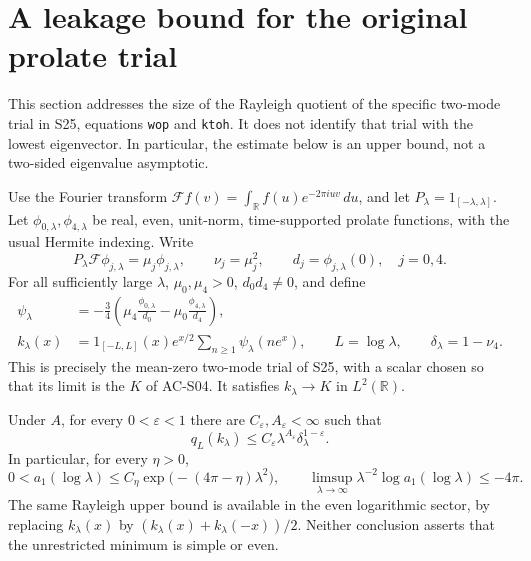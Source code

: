 \section{A leakage bound for the original prolate trial}
\label{sec:spectral-prolate-rayleigh}

This section addresses the size of the Rayleigh quotient of the
specific two-mode trial in S25, equations \texttt{wop} and
\texttt{ktoh}.  It does not identify that trial with the lowest
eigenvector.  In particular, the estimate below is an upper bound,
not a two-sided eigenvalue asymptotic.

\begin{theorem}
\label{AC-S30}
Use the Fourier transform
$\mathcal Ff(v)=\int_{\mathbb R}f(u)e^{-2\pi iuv}\,du$,
and let $P_\lambda=1_{[-\lambda,\lambda]}$.
Let $\phi_{0,\lambda},\phi_{4,\lambda}$ be real, even,
unit-norm, time-supported prolate functions, with the usual
Hermite indexing.  Write
\[
 P_\lambda\mathcal F\phi_{j,\lambda}
       =\mu_j\phi_{j,\lambda},\qquad
 \nu_j=\mu_j^2,\qquad d_j=\phi_{j,\lambda}(0),
             \quad j=0,4.                         \tag{SR.1}
\]
For all sufficiently large $\lambda$, $\mu_0,\mu_4>0$,
$d_0d_4\ne0$, and define
\[
 \begin{split}
 \psi_\lambda&=-\frac34\left(
          \mu_4\frac{\phi_{0,\lambda}}{d_0}
             -\mu_0\frac{\phi_{4,\lambda}}{d_4}\right),\\
 k_\lambda(x)&=1_{[-L,L]}(x)e^{x/2}
                 \sum_{n\geq1}\psi_\lambda(ne^x),
                  \qquad L=\log\lambda,\qquad
 \delta_\lambda=1-\nu_4.                           \end{split}
 \tag{SR.2}
\]
This is precisely the mean-zero two-mode trial of S25,
with a scalar chosen so that its limit is the $K$ of AC-S04.
It satisfies $k_\lambda\to K$ in $L^2(\mathbb R)$.

Under $A$, for every $0<\varepsilon<1$ there are
$C_\varepsilon,A_\varepsilon<\infty$ such that
\[
 q_L(k_\lambda)\leq
       C_\varepsilon\lambda^{A_\varepsilon}
                       \delta_\lambda^{1-\varepsilon}.
                                                        \tag{SR.3}
\]
In particular, for every $\eta>0$,
\[
 0<a_1(\log\lambda)
       \leq C_\eta\exp\bigl(-(4\pi-\eta)\lambda^2\bigr),
 \qquad
 \limsup_{\lambda\to\infty}
            \lambda^{-2}\log a_1(\log\lambda)\leq-4\pi.
                                                        \tag{SR.4}
\]
The same Rayleigh upper bound is available in the even
logarithmic sector, by replacing $k_\lambda(x)$ by
$(k_\lambda(x)+k_\lambda(-x))/2$.
Neither conclusion asserts that the unrestricted minimum
is simple or even.
\end{theorem}

